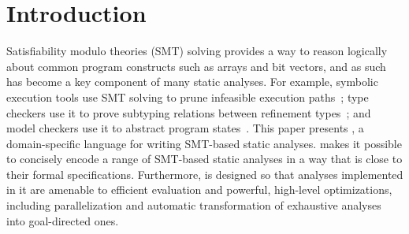 \documentclass[acmsmall,screen,nonacm]{acmart}
\theoremstyle{definition}
\begin{document}


\maketitle


\section{Introduction}

Satisfiability modulo theories (SMT) solving provides a way to reason logically
about common program constructs such as arrays and bit vectors, and as such has
become a key component of many static analyses. 
For example, symbolic execution tools use SMT solving to prune infeasible
execution paths~\citep{klee,symexecsurvey}; type checkers use it to prove
subtyping relations between refinement types~\citep{dminor,Rondon08liquid}; and
model checkers use it to abstract program
states~\citep{lazyabsinterpolants,cimatti2012software}.
This paper presents \Name, a domain-specific language for writing SMT-based
static analyses.
\Name makes it possible to concisely encode a range of SMT-based static
analyses in a way that is close to their formal specifications.
Furthermore, \Name is designed so that analyses implemented in it are amenable
to efficient evaluation and powerful, high-level optimizations, including
parallelization and automatic transformation of exhaustive analyses into
goal-directed ones.
\end{document}
